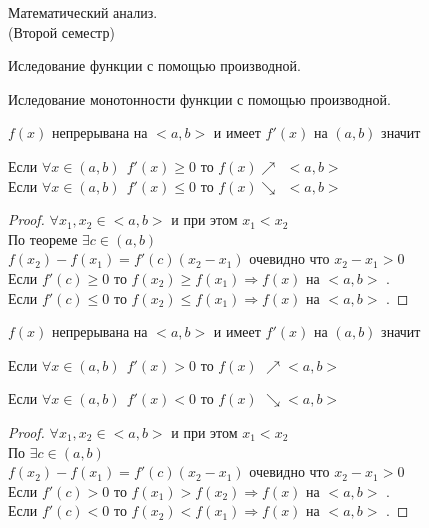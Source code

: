 \begin{title}
  Математический анализ.\\
  (Второй семестр)
\end{title}

\begin{title}
  Иследование функции с помощью производной.
\end{title}

\begin{title}[\Large]
  Иследование монотонности функции с помощью производной.
\end{title}

\begin{theorem}
  $f(x)$ непрерывана на $<a,b>$ и имеет $f'(x)$ на $(a,b)$ значит

  Если $\forall x \in (a,b) ~~ f'(x) \ge 0 $ то $f(x) \nearrow ~~ <a,b>$\\
  Если $\forall x \in (a,b) ~~ f'(x) \le 0 $ то $f(x) \searrow ~~ <a,b>$
\end{theorem}

\begin{proof}
  $\forall x_1, x_2 \in <a,b>$ и при этом $x_1 < x_2 $\\
  По теореме  $\exists c \in (a,b)$\\
  $f(x_2) - f(x_1) = f'(c)(x_2 - x_1)$ очевидно что $x_2 - x_1 > 0 $\\
  Если $f'(c) \ge 0$ то $f(x_2) \ge f(x_1) \Rightarrow f(x)$ на $<a,b>$
  .\\
  Если $f'(c) \le 0$ то $f(x_2) \le f(x_1) \Rightarrow f(x)$ на $<a,b>$
  .
\end{proof}

\begin{theorem}
  $f(x)$ непрерывана на $<a,b>$ и имеет $f'(x)$ на $(a,b)$ значит

  Если $\forall x \in (a, b) ~~ f'(x) > 0$ то $f(x)$ 
  $\nearrow <a,b>$

  Если $\forall x \in (a, b) ~~ f'(x) < 0$ то $f(x)$ 
  $\searrow <a,b>$
\end{theorem}

\begin{proof}
  $\forall x_1, x_2 \in <a,b>$ и при этом $x_1 < x_2 $\\
  По  $\exists c \in (a,b)$\\
  $f(x_2) - f(x_1) = f'(c)(x_2 - x_1)$ очевидно что $x_2 - x_1 > 0$\\
  Если $f'(c) > 0$ то $f(x_1) > f(x_2) \Rightarrow f(x)$ на $<a,b>$
  .\\
  Если $f'(c) < 0$ то $f(x_2) < f(x_1) \Rightarrow f(x)$ на $<a,b>$
  .
\end{proof}

